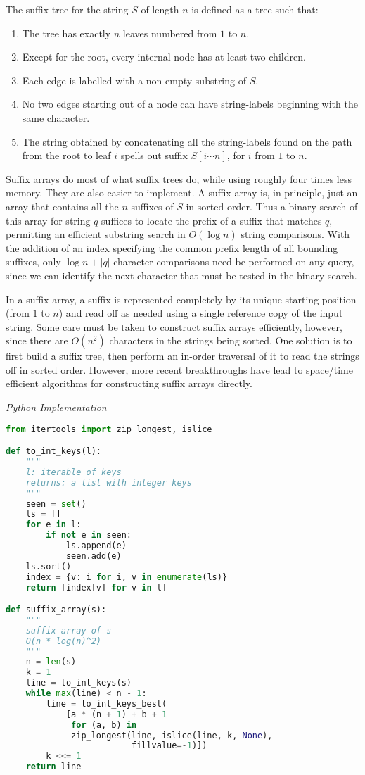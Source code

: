 \documentclass{article}
\begin{document}
    The suffix tree for the string $S$ of length $n$ is defined as a tree such that:
    \begin{enumerate}
        \item The tree has exactly $n$ leaves numbered from $1$ to $n$.
        \item Except for the root, every internal node has at least two children.
        \item Each edge is labelled with a non-empty substring of $S$.
        \item No two edges starting out of a node can have string-labels beginning with the same character.
        \item The string obtained by concatenating all the string-labels found on the path from the root to leaf $i$ spells out suffix $S[i \cdots n]$, for $i$ from $1$ to $n$.
    \end{enumerate}
    Suffix arrays do most of what suffix trees do, while using roughly four times less memory. They are also easier to implement. A suffix array is, in principle, just an array that contains all the $n$ suffixes of $S$ in sorted order. Thus a binary search of this array for string $q$ suffices to locate the prefix of a suffix that matches $q$, permitting an efficient substring search in $O(\log n)$ string comparisons. With the addition of an index specifying the common prefix length of all bounding suffixes, only $\log n+|q|$ character comparisons need be performed on any query, since we can identify the next character that must be tested in the binary search.
    
    In a suffix array, a suffix is represented completely by its unique starting position (from $1$ to $n$) and read off as needed using a single reference copy of the input string. Some care must be taken to construct suffix arrays efficiently, however, since there are $O(n^2)$ characters in the strings being sorted. One solution is to first build a suffix tree, then perform an in-order traversal of it to read the strings off in sorted order. However, more recent breakthroughs have lead to space/time efficient algorithms for constructing suffix arrays directly.

\vspace{8pt} \emph{Python Implementation}
\begin{lstlisting}[language=Python]
from itertools import zip_longest, islice

def to_int_keys(l):
    """
    l: iterable of keys
    returns: a list with integer keys
    """
    seen = set()
    ls = []
    for e in l:
        if not e in seen:
            ls.append(e)
            seen.add(e)
    ls.sort()
    index = {v: i for i, v in enumerate(ls)}
    return [index[v] for v in l]

def suffix_array(s):
    """
    suffix array of s
    O(n * log(n)^2)
    """
    n = len(s)
    k = 1
    line = to_int_keys(s)
    while max(line) < n - 1:
        line = to_int_keys_best(
            [a * (n + 1) + b + 1
             for (a, b) in
             zip_longest(line, islice(line, k, None),
                         fillvalue=-1)])
        k <<= 1
    return line
\end{lstlisting}
    
\end{document}

